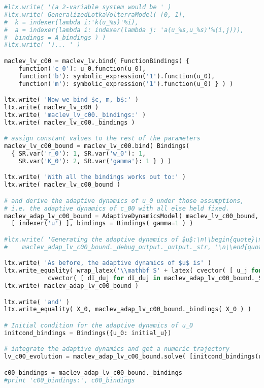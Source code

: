 \begin{lstlisting}[language=Python]
#ltx.write( '(a 2-variable system would be ' )
#ltx.write( GeneralizedLotkaVolterraModel( [0, 1],
#  k = indexer(lambda i:'k(u_%s)'%i),
#  a = indexer(lambda i: indexer(lambda j: 'a(u_%s,u_%s)'%(i,j))),
#  bindings = A_bindings ) )
#ltx.write( ')... ' )

maclev_lv_c00 = maclev_lv.bind( FunctionBindings( {
    function('c_0'): u_0.function(u_0),
    function('b'): symbolic_expression('1').function(u_0),
    function('m'): symbolic_expression('1').function(u_0) } ) )

ltx.write( 'Now we bind $c, m, b$:' )
ltx.write( maclev_lv_c00 )
ltx.write( 'maclev_lv_c00._bindings:' )
ltx.write( maclev_lv_c00._bindings )

# assign constant values to the rest of the parameters
maclev_lv_c00_bound = maclev_lv_c00.bind( Bindings( 
  { SR.var('r_0'): 1, SR.var('w_0'): 1,
    SR.var('K_0'): 2, SR.var('gamma'): 1 } ) )

ltx.write( 'With all the bindings works out to:' )
ltx.write( maclev_lv_c00_bound )

# and derive the adaptive dynamics of u_0 under those assumptions,
# i.e. the adaptive dynamics of c_00 with all else held fixed.
maclev_adap_lv_c00_bound = AdaptiveDynamicsModel( maclev_lv_c00_bound,
  [ indexer('u') ], bindings = Bindings( gamma=1 ) )

#ltx.write( 'Generating the adaptive dynamics of $u$:\n\\begin{quote}\n',
#    maclev_adap_lv_c00_bound._debug_output._output._str, '\n\\end{quote}\n' )

ltx.write( 'As before, the adaptive dynamics of $u$ is' )
ltx.write_equality( wrap_latex('\\mathbf S' + latex( cvector( [ u_j for u_j in maclev_adap_lv_c00_bound._S.keys() ] ) ) ),
            cvector( [ dI_duj for dI_duj in maclev_adap_lv_c00_bound._S.values() ] ) )
ltx.write( maclev_adap_lv_c00_bound )

ltx.write( 'and' )
ltx.write_equality( X_0, maclev_adap_lv_c00_bound._bindings( X_0 ) )

# Initial condition for the adaptive dynamics of u_0
initcond_bindings = Bindings({u_0: initial_u})

# integrate the adaptive dynamics and get a numeric trajectory
lv_c00_evolution = maclev_adap_lv_c00_bound.solve( [initcond_bindings(u_0)] )

c00_bindings = maclev_adap_lv_c00_bound._bindings
#print 'c00_bindings:', c00_bindings


\end{lstlisting}
